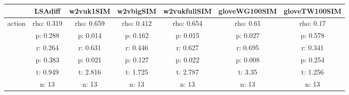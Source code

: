 \documentclass{article}
\begin{document}
\begin{tabular}{ccccccc|}\cline{2-7}
&\multicolumn{1}{|c}{LSAdiff} & w2vuk1SIM & w2vbigSIM & w2vukfullSIM & gloveWG100SIM & gloveTW100SIM \\\hline
\multicolumn{1}{|c|}{\multirow{6}{*}{action}} & rho: 0.319 & rho: 0.659 & rho: 0.412 & rho: 0.654 & rho: 0.61 & rho: 0.17 \\
\multicolumn{1}{|c|}{} & p: 0.288 & p: 0.014 & p: 0.162 & p: 0.015 & p: 0.027 & p: 0.578 \\
\multicolumn{1}{|c|}{} & r: 0.264 & r: 0.631 & r: 0.446 & r: 0.627 & r: 0.695 & r: 0.341 \\
\multicolumn{1}{|c|}{} & p: 0.383 & p: 0.021 & p: 0.127 & p: 0.022 & p: 0.008 & p: 0.254 \\
\multicolumn{1}{|c|}{} & t: 0.949 & t: 2.816 & t: 1.725 & t: 2.787 & t: 3.35 & t: 1.256 \\
\multicolumn{1}{|c|}{} & n: 13 & n: 13 & n: 13 & n: 13 & n: 13 & n: 13 \\
\hline
\end{tabular}\\
\end{document}
